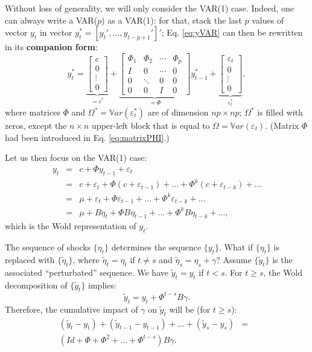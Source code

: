 \documentclass[
  12pt,
]{book}
\theoremstyle{definition}
\theoremstyle{definition}
\theoremstyle{definition}
\theoremstyle{definition}
\theoremstyle{remark}
\begin{document}
Without loss of generality, we will only consider the VAR(1) case. Indeed, one can always write a VAR(\(p\)) as a VAR(1): for that, stack the last \(p\) values of vector \(y_t\) in vector \(y_{t}^{*}=[y_t',\dots,y_{t-p+1}']'\); Eq. \eqref{eq:yVAR} can then be rewritten in its \textbf{companion form}:
\begin{equation}
y_{t}^{*} =
\underbrace{\left[\begin{array}{c}
c\\
0\\
\vdots\\
0\end{array}\right]}_{=c^*}+
\underbrace{\left[\begin{array}{cccc}
\Phi_{1} & \Phi_{2} & \cdots & \Phi_{p}\\
I & 0 & \cdots & 0\\
0 & \ddots & 0 & 0\\
0 & 0 & I & 0\end{array}\right]}_{=\Phi}
y_{t-1}^{*}+
\underbrace{\left[\begin{array}{c}
\varepsilon_{t}\\
0\\
\vdots\\
0\end{array}\right]}_{\varepsilon_t^*},\label{eq:ystarVAR}
\end{equation}
where matrices \(\Phi\) and \(\Omega^* = \mathbb{V}ar(\varepsilon_t^*)\) are of dimension \(np \times np\); \(\Omega^*\) is filled with zeros, except the \(n\times n\) upper-left block that is equal to \(\Omega = \mathbb{V}ar(\varepsilon_t)\). (Matrix \(\Phi\) had been introduced in Eq. \eqref{eq:matrixPHI}.)

Let us then focus on the VAR(1) case:
\begin{eqnarray*}
y_{t} &=& c+\Phi y_{t-1}+\varepsilon_{t}\\
& = & c+\varepsilon_{t}+\Phi(c+\varepsilon_{t-1})+\ldots+\Phi^{k}(c+\varepsilon_{t-k})+\ldots \\
& = & \mu +\varepsilon_{t}+\Phi\varepsilon_{t-1}+\ldots+\Phi^{k}\varepsilon_{t-k}+\ldots \\
& = & \mu +B\eta_{t}+\Phi B\eta_{t-1}+\ldots+\Phi^{k}B\eta_{t-k}+\ldots,
\end{eqnarray*}
which is the Wold representation of \(y_t\).

The sequence of shocks \(\{\eta_t\}\) determines the sequence \(\{y_t\}\). What if \(\{\eta_t\}\) is replaced with \(\{\tilde{\eta}_t\}\), where \(\tilde{\eta}_t=\eta_t\) if \(t \ne s\) and \(\tilde{\eta}_s=\eta_s + \gamma\)? Assume \(\{\tilde{y}_t\}\) is the associated ``perturbated'' sequence. We have \(\tilde{y}_t = y_t\) if \(t<s\). For \(t \ge s\), the Wold decomposition of \(\{\tilde{y}_t\}\) implies:
\[
\tilde{y}_t = y_t + \Phi^{t-s} B \gamma.
\]
Therefore, the cumulative impact of \(\gamma\) on \(\tilde{y}_t\) will be (for \(t \ge s\)):
\begin{eqnarray}
(\tilde{y}_t - y_t) +  (\tilde{y}_{t-1} - y_{t-1}) + \dots +  (\tilde{y}_s - y_s) &=& \nonumber \\
(Id + \Phi + \Phi^2 + \dots + \Phi^{t-s}) B \gamma.&& \label{eq:cumul}
\end{eqnarray}
\end{document}
